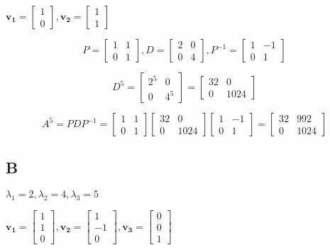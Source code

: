 \documentclass{article}
\begin{document}
$\mathbf{v_1} = \begin{bmatrix} 1 \\ 0 \end{bmatrix}, \mathbf{v_2} = \begin{bmatrix} 1 \\ 1 \end{bmatrix}$

\[P = \begin{bmatrix} 1 & 1 \\ 0 & 1 \end{bmatrix},  D = \begin{bmatrix} 2 & 0 \\ 0 & 4 \end{bmatrix}, P^{-1} = \begin{bmatrix} 1 & -1 \\ 0 & 1 \end{bmatrix}\]

\[D^5 = \begin{bmatrix} 2^5 & 0 \\ 0 & 4^5 \end{bmatrix} = \begin{bmatrix} 32 & 0 \\ 0 & 1024 \end{bmatrix}\]

\[A^5 = PDP^{-1} =  \begin{bmatrix} 1 & 1 \\ 0 & 1 \end{bmatrix} \begin{bmatrix} 32 & 0 \\ 0 & 1024 \end{bmatrix} \begin{bmatrix} 1 & -1 \\ 0 & 1 \end{bmatrix} = \begin{bmatrix} 32 & 992 \\ 0 & 1024 \end{bmatrix}\]

\subsection*{B}

$\lambda_1 = 2, \lambda_2 = 4, \lambda_3 = 5$

$\mathbf{v_1} = \begin{bmatrix} 1 \\ 1 \\ 0 \end{bmatrix}, \mathbf{v_2} = \begin{bmatrix} 1 \\ -1 \\ 0 \end{bmatrix}, \mathbf{v_3} = \begin{bmatrix} 0 \\ 0 \\ 1 \end{bmatrix}$
\end{document}

